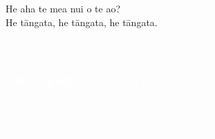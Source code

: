 \documentclass{beamer}
\begin{document}
   \begin{frame}
   
   \begin{center}
   
   \Large{He aha te mea nui o te ao? }\\
   \Large{He t\={a}ngata,  he t\={a}ngata, he t\={a}ngata.}\\
   
   \textcolor{white}{
  \bigskip   
   \Large{What is the most important thing in the world?}\\   
   \Large{It is people, it is people, it is people.}\\
   
\bigskip   
   
   \Large{\begin{CJK}{UTF8}{min}\textcolor{white}{世界で一番重要なことは何ですか？}\end{CJK}}\\
   \Large{\begin{CJK}{UTF8}{min}\textcolor{white}{人々だし、人々だし、人々です。}\end{CJK}}
   }
   \end{center}

  \end{frame}  
  
\end{document}
